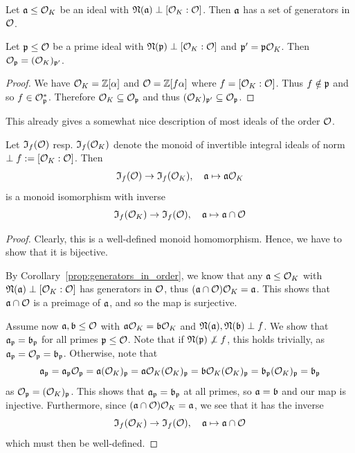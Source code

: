 \begin{corollary}
    \label{prop:generators_in_order}
    Let $\a \leq \O_K$ be an ideal with $\Norm(\a) \perp [\O_K : \O]$. Then $\a$ has a set of generators in $\O$.
\end{corollary}
\begin{prop}
    \label{prop:prime_coprime_localization_same}
    Let $\p \leq \O$ be a prime ideal with $\Norm(\p) \perp [\O_K : \O]$ and $\p' = \p\O_K$.
    Then $\O_\p = (\O_K)_{\p'}$.
\end{prop}
\begin{proof}
    We have $\O_K = \Z[\alpha]$ and $\O = \Z[f\alpha]$ where $f = [\O_K : \O]$.
    Thus $f \notin \p$ and so $f \in \O_\p^*$.
    Therefore $\O_K \subseteq \O_\p$ and thus $(\O_K)_{\p'} \subseteq \O_\p$.
\end{proof}
This already gives a somewhat nice description of most ideals of the order $\O$.
\begin{prop}
    \label{prop:coprime_ideals_order}
    Let $\mathfrak{I}_f(\O)$ resp. $\mathfrak{I}_f(\O_K)$ denote the monoid of invertible integral ideals of norm $\perp f := [\O_K : \O]$.
    Then
    \begin{align*}
        \mathfrak{I}_f(\O) \to \mathfrak{I}_f(\O_K), \quad \a \mapsto \a\O_K
    \end{align*}
    is a monoid isomorphism with inverse
    \begin{equation*}
        \mathfrak{I}_f(\O_K) \to \mathfrak{I}_f(\O), \quad \a \mapsto \a \cap \O
    \end{equation*}
\end{prop}
\begin{proof}
    Clearly, this is a well-defined monoid homomorphism.
    Hence, we have to show that it is bijective.

    By Corollary~\ref{prop:generators_in_order}, we know that any $\a \leq \O_K$ with $\Norm(\a) \perp [\O_K : \O]$ has generators in $\O$, thus $(\a \cap \O)\O_K = \a$.
    This shows that $\a \cap \O$ is a preimage of $\a$, and so the map is surjective. 

    Assume now $\a, \b \leq \O$ with $\a\O_K = \b\O_K$ and $\Norm(\a), \Norm(\b) \perp f$.
    We show that $\a_\p = \b_\p$ for all primes $\p \leq \O$.
    Note that if $\Norm(\p) \not\perp f$, this holds trivially, as $\a_\p = \O_\p = \b_\p$.
    Otherwise, note that
    \begin{equation*}
        \a_\p = \a_\p \O_\p = \a (\O_K)_\p = \a\O_K(\O_K)_\p = \b\O_K(\O_K)_\p = \b_\p (\O_K)_\p = \b_\p
    \end{equation*}
    as $\O_\p = (\O_K)_\p$.
    This shows that $\a_\p = \b_\p$ at all primes, so $\a = \b$ and our map is injective.
    Furthermore, since $(\a \cap \O)\O_K = \a$, we see that it has the inverse
    \begin{equation*}
        \mathfrak{I}_f(\O_K) \to \mathfrak{I}_f(\O), \quad \a \mapsto \a \cap \O
    \end{equation*}
    which must then be well-defined.
\end{proof}
